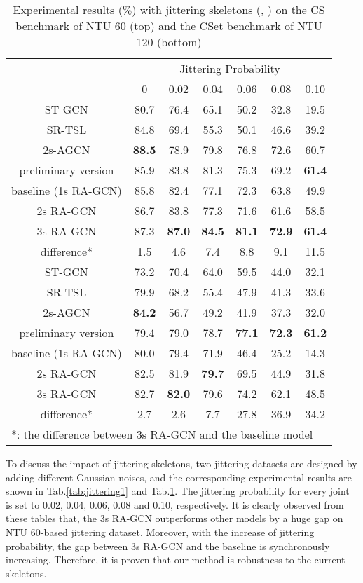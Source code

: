 \documentclass[journal]{IEEEtran}
\begin{document}
\begin{table}[t]
\caption{Experimental results (\%) with jittering skeletons (, ) on the CS benchmark of NTU 60 (top) and the CSet benchmark of NTU 120 (bottom)}
\label{tab:jittering2}
\centering
\begin{tabular}{ccccccc}
\hline
 & \multicolumn{6}{c}{Jittering Probability} \\
\cline{2-7}
 & 0 & 0.02 & 0.04 & 0.06 & 0.08 & 0.10 \\
\hline
\hline
ST-GCN \cite{yan2018spatial} & 80.7 & 76.4 & 65.1 & 50.2 & 32.8 & 19.5 \\
SR-TSL \cite{si2018skeleton} & 84.8 & 69.4 & 55.3 & 50.1 & 46.6 & 39.2 \\
2s-AGCN \cite{shi2019two} & {\bf 88.5} & 78.9 & 79.8 & 76.8 & 72.6 & 60.7 \\
preliminary version \cite{song2019richly} & 85.9 & 83.8 & 81.3 & 75.3 & 69.2 & {\bf 61.4} \\
baseline (1s RA-GCN) & 85.8 & 82.4 & 77.1 & 72.3 & 63.8 & 49.9 \\
2s RA-GCN & 86.7 & 83.8 & 77.3 & 71.6 & 61.6 & 58.5 \\
3s RA-GCN & 87.3 & {\bf 87.0} & {\bf 84.5} & {\bf 81.1} & {\bf 72.9} & {\bf 61.4} \\
difference* & 1.5 & 4.6 & 7.4 & 8.8 & 9.1 & 11.5 \\
\hline
\hline
ST-GCN \cite{yan2018spatial} & 73.2 & 70.4 & 64.0 & 59.5 & 44.0 & 32.1 \\
SR-TSL \cite{si2018skeleton} & 79.9 & 68.2 & 55.4 & 47.9 & 41.3 & 33.6 \\
2s-AGCN \cite{shi2019two} & {\bf 84.2} & 56.7 & 49.2 & 41.9 & 37.3 & 32.0 \\
preliminary version \cite{song2019richly} & 79.4 & 79.0 & 78.7 & {\bf 77.1} & {\bf 72.3} & {\bf 61.2} \\
baseline (1s RA-GCN) & 80.0 & 79.4 & 71.9 & 46.4 & 25.2 & 14.3 \\
2s RA-GCN & 82.5 & 81.9 & {\bf 79.7} & 69.5 & 44.9 & 31.8 \\
3s RA-GCN & 82.7 & {\bf 82.0} & 79.6 & 74.2 & 62.1 & 48.5 \\
difference* & 2.7 & 2.6 & 7.7 & 27.8 & 36.9 & 34.2 \\
\hline
\multicolumn{7}{l}{*: the difference between 3s RA-GCN and the baseline model}
\end{tabular}
\vspace{-0.4cm}
\end{table}

To discuss the impact of jittering skeletons, two jittering datasets are designed by adding different Gaussian noises, and the corresponding experimental results are shown in Tab.\ref{tab:jittering1} and Tab.\ref{tab:jittering2}. The jittering probability for every joint is set to 0.02, 0.04, 0.06, 0.08 and 0.10, respectively. It is clearly observed from these tables that, the 3s RA-GCN outperforms other models by a huge gap on NTU 60-based jittering dataset. Moreover, with the increase of jittering probability, the gap between 3s RA-GCN and the baseline is synchronously increasing. Therefore, it is proven that our method is robustness to the current skeletons.
\end{document}
